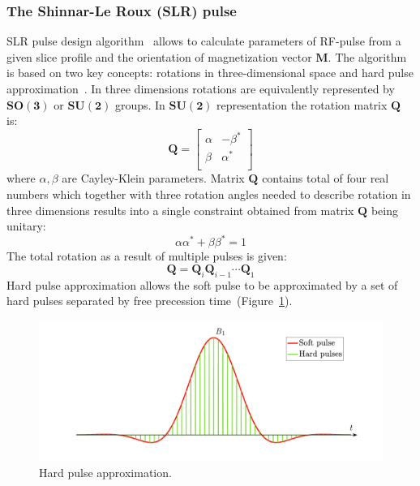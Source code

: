 \subsubsection{The Shinnar-Le Roux (SLR) pulse}
SLR pulse design algorithm~\cite{Leroux:1990tk} allows to calculate parameters of RF-pulse from a given slice profile and  the orientation of magnetization vector $\mathbf{M}$. 
The algorithm is based on two key concepts: rotations in three-dimensional space and hard pulse approximation~\cite{RNDT24}. 
In three dimensions rotations are equivalently represented by $\mathbf{SO(3)}$ or $\mathbf{SU(2)}$ groups. 
In $\mathbf{SU(2)}$ representation the rotation matrix $\mathbf{Q}$ is:
\begin{equation}\label{eq: Rotation matrix Q}
\mathbf{Q} = 
	\begin{bmatrix}
    \alpha & -\beta^*\\
    \beta & \alpha^*\\
   	\end{bmatrix}
\end{equation}
where $\alpha, \beta$ are Cayley-Klein parameters. 
Matrix $\mathbf{Q}$ contains total of four real numbers which together with three rotation angles needed to describe rotation in three dimensions results into a single constraint obtained from matrix $\mathbf{Q}$ being unitary:
\begin{equation}\label{eq: C-K normalization}
\alpha \alpha^*+\beta\beta^* = 1
\end{equation}
The total rotation as a result of multiple pulses is given:
\begin{equation}\label{eq: Q rotations}
\mathbf{Q} = \mathbf{Q}_{i}\mathbf{Q}_{i-1}\cdots\mathbf{Q}_{1}
\end{equation}
Hard pulse approximation allows the soft pulse to be approximated by a set of hard pulses separated by free precession time~(Figure~\ref{fig:SLR}).
\begin{figure}[!ht]
\vspace{+0.2cm}
\centering
\includegraphics[width=\textwidth]{Figures/SLR.pdf}
\caption[Hard pulse approximation]{Hard pulse approximation.}
\label{fig:SLR}
\end{figure}
